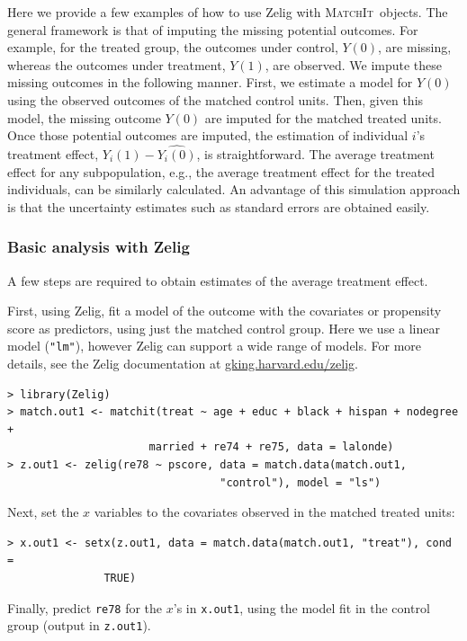 \documentclass[oneside,letterpaper,titlepage]{article}
\newcommand{\MatchIt}{\textsc{MatchIt}}
\begin{document}
Here we provide a few examples of how to use Zelig with \MatchIt\ 
objects.  The general framework is that of imputing the missing
potential outcomes.  For example, for the treated group, the outcomes
under control, $Y(0)$, are missing, whereas the outcomes under
treatment, $Y(1)$, are observed.  We impute these missing outcomes in
the following manner. First, we estimate a model for $Y(0)$ using the
observed outcomes of the matched control units. Then, given this
model, the missing outcome $Y(0)$ are imputed for the matched treated
units. Once those potential outcomes are imputed, the estimation of
individual $i$'s treatment effect, $Y_i(1)-\widehat{Y_i(0)}$, is
straightforward. The average treatment effect for any subpopulation,
e.g., the average treatment effect for the treated individuals, can be
similarly calculated. An advantage of this simulation approach is that
the uncertainty estimates such as standard errors are obtained easily.

\subsubsection{Basic analysis with Zelig}
A few steps are required to obtain estimates of the average treatment
effect.

First, using Zelig, fit a model of the outcome with the covariates or
propensity score as predictors, using just the matched control group.
Here we use a linear model ({\tt "lm"}), however Zelig can support a
wide range of models.  For more details, see the Zelig documentation
at \href{gking.harvard.edu/zelig}{gking.harvard.edu/zelig}.

\begin{verbatim}
> library(Zelig)
> match.out1 <- matchit(treat ~ age + educ + black + hispan + nodegree +
                      married + re74 + re75, data = lalonde)
> z.out1 <- zelig(re78 ~ pscore, data = match.data(match.out1,
                                 "control"), model = "ls")
\end{verbatim}

Next, set the $x$ variables to the covariates observed in the matched
treated units:
\begin{verbatim}
> x.out1 <- setx(z.out1, data = match.data(match.out1, "treat"), cond =
               TRUE)
\end{verbatim}

Finally, predict {\tt re78} for the $x$'s in {\tt x.out1}, using the
model fit in the control group (output in {\tt z.out1}).
\end{document}

